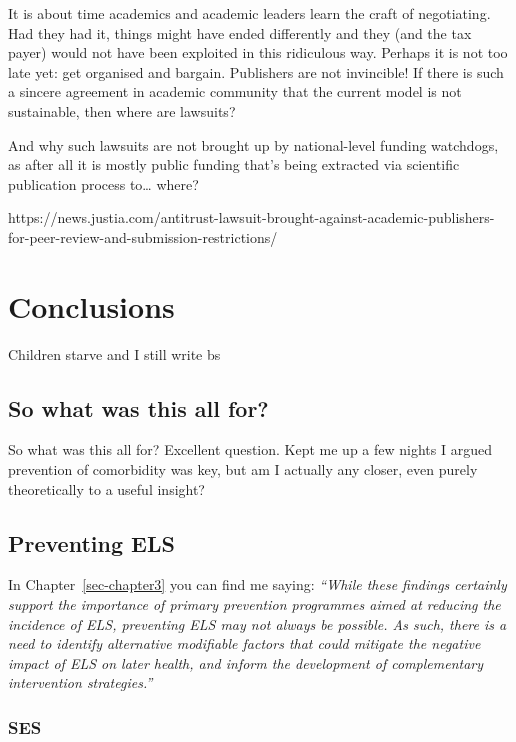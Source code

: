 \documentclass[
  letterpaper,
  DIV=11,
  numbers=noendperiod]{scrreport}
\begin{document}
It is about time academics and academic leaders learn the craft of
negotiating. Had they had it, things might have ended differently and
they (and the tax payer) would not have been exploited in this
ridiculous way. Perhaps it is not too late yet: get organised and
bargain. Publishers are not invincible! If there is such a sincere
agreement in academic community that the current model is not
sustainable, then where are lawsuits?

And why such lawsuits are not brought up by national-level funding
watchdogs, as after all it is mostly public funding that's being
extracted via scientific publication process to\ldots{} where?

https://news.justia.com/antitrust-lawsuit-brought-against-academic-publishers-for-peer-review-and-submission-restrictions/

\section{Conclusions}\label{conclusions-3}

Children starve and I still write bs

\subsection{So what was this all for?}\label{so-what-was-this-all-for}

So what was this all for? Excellent question. Kept me up a few nights I
argued prevention of comorbidity was key, but am I actually any closer,
even purely theoretically to a useful insight?

\subsection{Preventing ELS}\label{preventing-els}

In Chapter~\ref{sec-chapter3} you can find me saying: \emph{``While
these findings certainly support the importance of primary prevention
programmes aimed at reducing the incidence of ELS, preventing ELS may
not always be possible. As such, there is a need to identify alternative
modifiable factors that could mitigate the negative impact of ELS on
later health, and inform the development of complementary intervention
strategies.''}

\subsubsection{SES}\label{ses}
\end{document}

